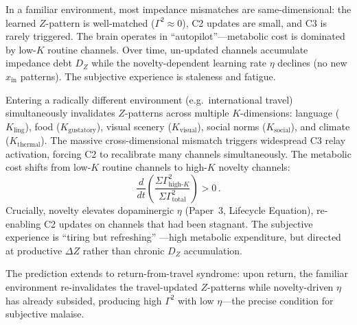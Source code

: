 \documentclass[aps,pre,twocolumn,superscriptaddress,floatfix]{revtex4-2}
\begin{document}
\begin{remark}
\label{rem:modal-transfer}
In a familiar environment, most impedance mismatches are
same-dimensional: the learned $Z$-pattern is well-matched
($\Gamma^2 \approx 0$), C2 updates are small, and C3
is rarely triggered.
The brain operates in ``autopilot''---metabolic cost is
dominated by low-$K$ routine channels.
Over time, un-updated channels accumulate impedance debt
$D_Z$ while the novelty-dependent learning rate $\eta$
declines (no new $x_{\text{in}}$ patterns).
The subjective experience is staleness and fatigue.

Entering a radically different environment (e.g.\
international travel) simultaneously invalidates
$Z$-patterns across multiple $K$-dimensions:
language ($K_{\text{ling}}$), food
($K_{\text{gustatory}}$), visual scenery
($K_{\text{visual}}$), social norms
($K_{\text{social}}$), and climate
($K_{\text{thermal}}$).
The massive cross-dimensional mismatch triggers
widespread C3 relay activation, forcing C2 to
recalibrate many channels simultaneously.
The metabolic cost shifts from low-$K$ routine
channels to high-$K$ novelty channels:
\[
  \frac{d}{dt}
  \left(
    \frac{\Sigma\Gamma^2_{\text{high-}K}}
         {\Sigma\Gamma^2_{\text{total}}}
  \right) > 0\,.
\]
Crucially, novelty elevates dopaminergic $\eta$
(Paper~3, Lifecycle Equation), re-enabling C2 updates
on channels that had been stagnant.
The subjective experience is ``tiring but refreshing''
---high metabolic expenditure, but directed at
productive $\Delta Z$ rather than chronic $D_Z$
accumulation.

The prediction extends to return-from-travel syndrome:
upon return, the familiar environment re-invalidates the
travel-updated $Z$-patterns while novelty-driven $\eta$
has already subsided, producing high $\Gamma^2$ with
low $\eta$---the precise condition for subjective
malaise.
\end{remark}
\end{document}
